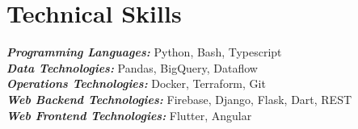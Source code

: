 \documentclass{article}
\begin{document}
\section{Technical Skills}
{\sl \textbf{Programming Languages:}} Python, Bash, Typescript \\
{\sl \textbf{Data Technologies:}} Pandas, BigQuery, Dataflow \\
{\sl \textbf{Operations Technologies:}} Docker, Terraform, Git \\
{\sl \textbf{Web Backend Technologies:}} Firebase, Django, Flask, Dart, REST \\
{\sl \textbf{Web Frontend Technologies:}} Flutter, Angular \\
\end{document}

